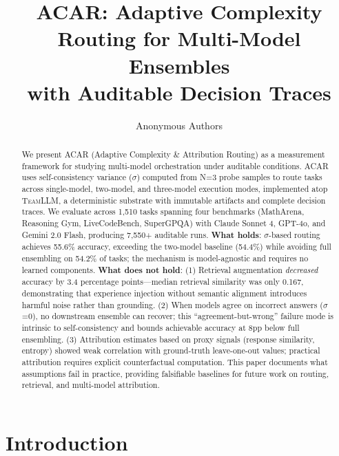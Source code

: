 \documentclass{article}
\title{ACAR: Adaptive Complexity Routing for Multi-Model Ensembles\\with Auditable Decision Traces}
\author{
    Anonymous Authors
}
\newcommand{\acar}{\textsc{ACAR}}
\newcommand{\teamllm}{\textsc{TeamLLM}}
\begin{document}
\maketitle

\begin{abstract}
We present \acar{} (Adaptive Complexity \& Attribution Routing) as a measurement framework for studying multi-model orchestration under auditable conditions.
\acar{} uses self-consistency variance ($\sigma$) computed from N=3 probe samples to route tasks across single-model, two-model, and three-model execution modes, implemented atop \teamllm{}, a deterministic substrate with immutable artifacts and complete decision traces.
We evaluate across 1,510 tasks spanning four benchmarks (MathArena, Reasoning Gym, LiveCodeBench, SuperGPQA) with Claude Sonnet 4, GPT-4o, and Gemini 2.0 Flash, producing 7,550+ auditable runs.
%
\textbf{What holds}: $\sigma$-based routing achieves 55.6\% accuracy, exceeding the two-model baseline (54.4\%) while avoiding full ensembling on 54.2\% of tasks; the mechanism is model-agnostic and requires no learned components.
%
\textbf{What does not hold}: (1) Retrieval augmentation \emph{decreased} accuracy by 3.4 percentage points---median retrieval similarity was only 0.167, demonstrating that experience injection without semantic alignment introduces harmful noise rather than grounding.
(2) When models agree on incorrect answers ($\sigma$=0), no downstream ensemble can recover; this ``agreement-but-wrong'' failure mode is intrinsic to self-consistency and bounds achievable accuracy at 8pp below full ensembling.
(3) Attribution estimates based on proxy signals (response similarity, entropy) showed weak correlation with ground-truth leave-one-out values; practical attribution requires explicit counterfactual computation.
%
This paper documents what assumptions fail in practice, providing falsifiable baselines for future work on routing, retrieval, and multi-model attribution.
\end{abstract}

\section{Introduction}
\end{document}
